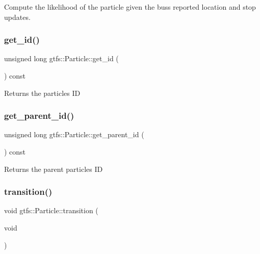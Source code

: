 Compute the likelihood of the particle given the bus\textquotesingle{}s reported location and stop updates. \mbox{\label{classgtfs_1_1Particle_a3131eb93ac902a4cccf42061e1a7296b}} 
\subsubsection{\texorpdfstring{get\+\_\+id()}{get\_id()}}
{\footnotesize\ttfamily unsigned long gtfs\+::\+Particle\+::get\+\_\+id (\begin{DoxyParamCaption}{ }\end{DoxyParamCaption}) const}

\begin{DoxyReturn}{Returns}
the particle\textquotesingle{}s ID 
\end{DoxyReturn}
\mbox{\label{classgtfs_1_1Particle_a9372dbbfe702b9931b9eb1ee217afcba}} 
\subsubsection{\texorpdfstring{get\+\_\+parent\+\_\+id()}{get\_parent\_id()}}
{\footnotesize\ttfamily unsigned long gtfs\+::\+Particle\+::get\+\_\+parent\+\_\+id (\begin{DoxyParamCaption}{ }\end{DoxyParamCaption}) const}

\begin{DoxyReturn}{Returns}
the parent particle\textquotesingle{}s ID 
\end{DoxyReturn}
\mbox{\label{classgtfs_1_1Particle_a768469c09fdebd8e190c91a653b25b76}} 
\subsubsection{\texorpdfstring{transition()}{transition()}}
{\footnotesize\ttfamily void gtfs\+::\+Particle\+::transition (\begin{DoxyParamCaption}\item[{void}]{ }\end{DoxyParamCaption})}

